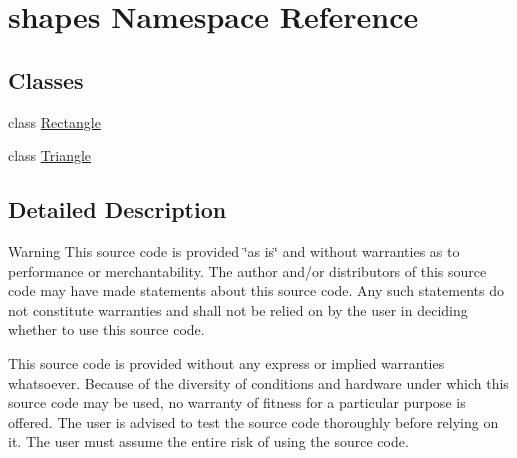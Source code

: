\hypertarget{namespaceshapes}{}\section{shapes Namespace Reference}
\label{namespaceshapes}
\subsection*{Classes}
\begin{DoxyCompactItemize}
\item 
class \mbox{\hyperlink{classshapes_1_1Rectangle}{Rectangle}}
\item 
class \mbox{\hyperlink{classshapes_1_1Triangle}{Triangle}}
\end{DoxyCompactItemize}


\subsection{Detailed Description}
\begin{DoxyWarning}{Warning}
This source code is provided \char`\"{}as is\char`\"{} and without warranties as to performance or merchantability. The author and/or distributors of this source code may have made statements about this source code. Any such statements do not constitute warranties and shall not be relied on by the user in deciding whether to use this source code.

This source code is provided without any express or implied warranties whatsoever. Because of the diversity of conditions and hardware under which this source code may be used, no warranty of fitness for a particular purpose is offered. The user is advised to test the source code thoroughly before relying on it. The user must assume the entire risk of using the source code. 
\end{DoxyWarning}
